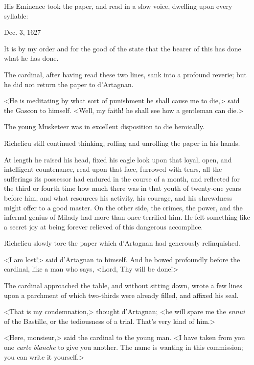 His Eminence took the paper, and read in a slow voice, dwelling upon every syllable: 


\begin{mail}{Dec. 3, 1627}{}

It is by my order and for the good of the state that the bearer of this has done what he has done.

\end{mail}

The cardinal, after having read these two lines, sank into a profound reverie; but he did not return the paper to d'Artagnan. 

<He is meditating by what sort of punishment he shall cause me to die,> said the Gascon to himself. <Well, my faith! he shall see how a gentleman can die.> 

The young Musketeer was in excellent disposition to die heroically. 

Richelieu still continued thinking, rolling and unrolling the paper in his hands. 

At length he raised his head, fixed his eagle look upon that loyal, open, and intelligent countenance, read upon that face, furrowed with tears, all the sufferings its possessor had endured in the course of a month, and reflected for the third or fourth time how much there was in that youth of twenty-one years before him, and what resources his activity, his courage, and his shrewdness might offer to a good master. On the other side, the crimes, the power, and the infernal genius of Milady had more than once terrified him. He felt something like a secret joy at being forever relieved of this dangerous accomplice. 

Richelieu slowly tore the paper which d'Artagnan had generously relinquished. 

<I am lost!> said d'Artagnan to himself. And he bowed profoundly before the cardinal, like a man who says, <Lord, Thy will be done!> 

The cardinal approached the table, and without sitting down, wrote a few lines upon a parchment of which two-thirds were already filled, and affixed his seal. 

<That is my condemnation,> thought d'Artagnan; <he will spare me the \textit{ennui} of the Bastille, or the tediousness of a trial. That's very kind of him.> 

<Here, monsieur,> said the cardinal to the young man. <I have taken from you one \textit{carte blanche} to give you another. The name is wanting in this commission; you can write it yourself.> 

